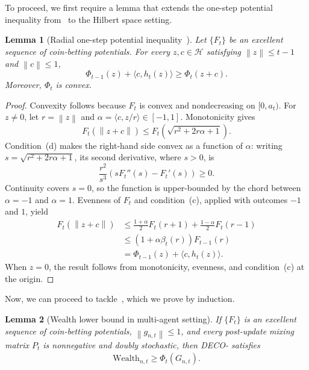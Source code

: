 \documentclass[journal]{IEEEtran}
\newtheorem{lemma}{Lemma}
\newcommand{\w}{\text{Wealth}}
\newcommand{\br}[1]{\left(#1\right)}
\newcommand{\norm}[1]{\left\lVert{#1}\right\rVert}
\newcommand{\Hil}{\mathcal{H}} %
\newcommand{\algname}{{DECO}\xspace}
\begin{document}
{\color{blue}
To proceed, we first require a lemma that extends the one-step potential inequality from~ to the Hilbert space setting.
\begin{lemma}[Radial one-step potential inequality~\cite{orabona_coin_2016}]\label{lemma:radial-potential}
    Let $\{F_t\}$ be an excellent sequence of coin-betting potentials.
    For every $z,c\in\Hil$ satisfying $\norm{z}\leq t-1$ and $\norm{c}\leq 1$,
    \begin{equation}
        \Phi_{t-1}(z)+\langle c,h_t(z)\rangle \geq \Phi_t(z+c).
    \end{equation}
    Moreover, $\Phi_t$ is convex.
\end{lemma}
\begin{proof}
    Convexity follows because $F_t$ is convex and nondecreasing on $[0,a_t)$. %
    For $z\neq0$, let $r=\norm{z}$ and $\alpha=\langle c,z/r\rangle\in[-1,1]$.
    Monotonicity gives
    \begin{equation}
        F_t(\norm{z+c})
        \leq F_t\left(\sqrt{r^2+2r\alpha+1}\right).
    \end{equation}
    Condition~(d) makes the right-hand side convex as a function of $\alpha$: writing $s=\sqrt{r^2+2r\alpha+1}$, its second derivative, where $s>0$, is
    \begin{equation}
        \frac{r^2}{s^3}\br{sF_t''(s)-F_t'(s)}\geq0.
    \end{equation}
    Continuity covers $s=0$, so the function is upper-bounded by the chord between $\alpha=-1$ and $\alpha=1$.
    Evenness of $F_t$ and condition~(c), applied with outcomes $-1$ and $1$, yield
    \begin{align}
        F_t(\norm{z+c})
         & \leq \frac{1+\alpha}{2}F_t(r+1)
        +\frac{1-\alpha}{2}F_t(r-1)                \\
         & \leq \br{1+\alpha\beta_t(r)}F_{t-1}(r)  \\
         & =\Phi_{t-1}(z)+\langle c,h_t(z)\rangle.
    \end{align}
    When $z=0$, the result follows from monotonicity, evenness, and condition~(c) at the origin.
\end{proof}

Now, we can proceed to tackle~, which we prove by induction.
\begin{lemma}[Wealth lower bound in multi-agent setting]\label{lemma:multi_agent_wealth_lb}
    If $\{F_t\}$ is an excellent sequence of coin-betting potentials, $\norm{g_{n,t}}\leq1$, and every post-update mixing matrix $P_t$ is nonnegative and doubly stochastic, then \algname{}- satisfies
    \begin{align}
        \w_{n,t} \geq \Phi_t(G_{n,t}).
    \end{align}
\end{lemma}

}
\end{document}
